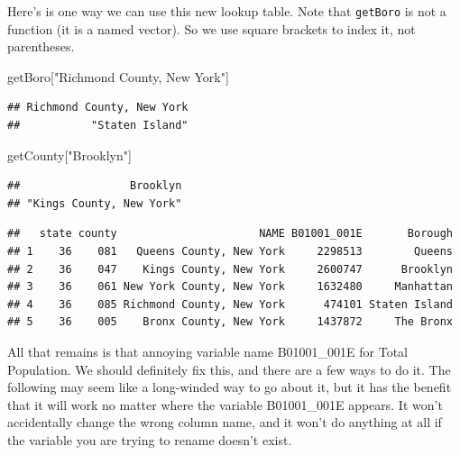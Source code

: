 \documentclass[openany]{book}
\newenvironment{Shaded}{\begin{snugshade}}{\end{snugshade}}
\newcommand{\NormalTok}[1]{#1}
\newcommand{\OperatorTok}[1]{\textcolor[rgb]{0.81,0.36,0.00}{\textbf{#1}}}
\newcommand{\StringTok}[1]{\textcolor[rgb]{0.31,0.60,0.02}{#1}}
\begin{document}
Here's is one way we can use this new lookup table. Note that \texttt{getBoro} is not a function (it is a named vector). So we use square brackets to index it, not parentheses.

\begin{Shaded}
\begin{Highlighting}[]
\NormalTok{getBoro[}\StringTok{"Richmond County, New York"}\NormalTok{]}
\end{Highlighting}
\end{Shaded}

\begin{verbatim}
## Richmond County, New York 
##           "Staten Island"
\end{verbatim}

\begin{Shaded}
\begin{Highlighting}[]
\NormalTok{getCounty[}\StringTok{"Brooklyn"}\NormalTok{]}
\end{Highlighting}
\end{Shaded}

\begin{verbatim}
##                 Brooklyn 
## "Kings County, New York"
\end{verbatim}

\begin{Shaded}
\end{Shaded}

\begin{verbatim}
##   state county                      NAME B01001_001E       Borough
## 1    36    081   Queens County, New York     2298513        Queens
## 2    36    047    Kings County, New York     2600747      Brooklyn
## 3    36    061 New York County, New York     1632480     Manhattan
## 4    36    085 Richmond County, New York      474101 Staten Island
## 5    36    005    Bronx County, New York     1437872     The Bronx
\end{verbatim}

All that remains is that annoying variable name B01001\_001E for Total Population. We should definitely fix this, and there are a few ways to do it. The following may seem like a long-winded way to go about it, but it has the benefit that it will work no matter where the variable B01001\_001E appears. It won't accidentally change the wrong column name, and it won't do anything at all if the variable you are trying to rename doesn't exist.
\end{document}
